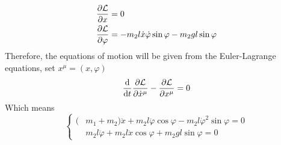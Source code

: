 \documentclass[../admech.tex]{subfiles}
\begin{document}
\begin{exe}
\begin{equation}
\begin{aligned}
			\pdv{\mathcal{L}}{x}&=0\\
			\pdv{\mathcal{L}}{\varphi}&=-m_2l\dot{x}\dot{\varphi}\sin\varphi-m_2gl\sin\varphi
		\end{aligned}
		\label{eq:lagdersp}
	\end{equation}
	Therefore, the equations of motion will be given from the Euler-Lagrange equations, set $x^\mu=(x,\varphi)$
	\begin{equation*}
		\dv{t}\pdv{\mathcal{L}}{\dot{x}^\mu}-\pdv{\mathcal{L}}{x^\mu}=0
	\end{equation*}
	Which means
	\begin{equation}
		\left\{\begin{aligned}
			(&m_1+m_2)\ddot{x}+m_2l\ddot{\varphi}\cos\varphi-m_2l\dot{\varphi}^2\sin\varphi=0\\
			&m_2l\ddot{\varphi}+m_2l\ddot{x}\cos\varphi+m_2gl\sin\varphi=0
		\end{aligned}\right.
		\label{eq:spel}
	\end{equation}
\end{exe}
\end{document}
